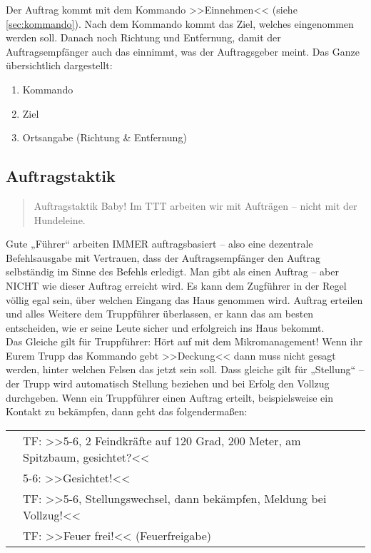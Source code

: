 Der Auftrag kommt mit dem Kommando >>Einnehmen<< (siehe \ref{sec:kommando}). Nach dem Kommando kommt das Ziel, welches eingenommen werden soll. Danach noch Richtung und Entfernung, damit der Auftragsempfänger auch das einnimmt, was der Auftragsgeber meint. Das Ganze übersichtlich dargestellt:

\begin{enumerate}
	\item Kommando
	\item Ziel
	\item Ortsangabe (Richtung \& Entfernung)
\end{enumerate}

\subsection{Auftragstaktik}\hfil
\begin{quote}
	\glqq Auftragstaktik Baby! Im \ac{TTT} arbeiten wir mit Aufträgen -- nicht mit der Hundeleine.\grqq
\end{quote}
Gute „Führer“ arbeiten IMMER auftragsbasiert -- also eine dezentrale Befehlsausgabe mit Vertrauen, dass der Auftragsempfänger den Auftrag selbständig im Sinne des Befehls erledigt. Man gibt als einen Auftrag – aber NICHT wie dieser Auftrag erreicht wird. Es kann dem Zugführer in der Regel völlig egal sein, über welchen Eingang das Haus genommen wird. Auftrag erteilen und alles Weitere dem Truppführer überlassen, er kann das am besten entscheiden, wie er seine Leute sicher und erfolgreich ins Haus bekommt.\\

Das Gleiche gilt für Truppführer: Hört auf mit dem Mikromanagement! Wenn ihr Eurem Trupp das Kommando gebt >>Deckung<< dann muss nicht gesagt werden, hinter welchen Felsen das jetzt sein soll. Dass gleiche gilt für „Stellung“ – der Trupp wird automatisch Stellung beziehen und bei Erfolg den Vollzug durchgeben. Wenn ein Truppführer einen Auftrag erteilt, beispielsweise ein Kontakt zu bekämpfen, dann geht das folgendermaßen:\\
\begin{tabular}{ll}
	& TF: >>5-6, 2 Feindkräfte auf 120 Grad, 200 Meter, am Spitzbaum, gesichtet?<<\\
	& 5-6: >>Gesichtet!<<\\
	& TF: >>5-6, Stellungswechsel, dann bekämpfen, Meldung bei Vollzug!<<\\
	& TF: >>Feuer frei!<< (Feuerfreigabe)\\
\end{tabular}


